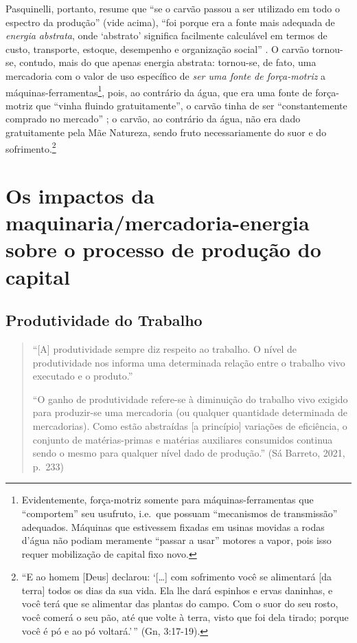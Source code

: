 \documentclass[12pt]{article}
\numberwithin{equation}{section}
\theoremstyle{plain}
\theoremstyle{definition}
\theoremstyle{remark}
\begin{document}
Pasquinelli, portanto, resume que ``se o carvão passou a ser utilizado em todo o espectro da produção'' (vide acima), ``foi porque era a fonte mais adequada de \textit{energia abstrata}, onde `abstrato' significa facilmente calculável em termos de custo, transporte, estoque, desempenho e organização social'' \parencite[, p. 122-3, grifo no original]{Pasquinelli2023}. O carvão tornou-se, contudo, mais do que apenas energia abstrata: tornou-se, de fato, uma mercadoria com o valor de uso específico de \textit{ser uma fonte de força-motriz} a máquinas-ferramentas\footnote{Evidentemente, força-motriz somente para máquinas-ferramentas que ``comportem'' seu usufruto, i.e.~que possuam ``mecanismos de transmissão'' adequados. Máquinas que estivessem fixadas em usinas movidas a rodas d'água não podiam meramente ``passar a usar'' motores a vapor, pois isso requer mobilização de capital fixo novo.}, pois, ao contrário da água, que era uma fonte de força-motriz que ``vinha fluindo gratuitamente'', o carvão tinha de ser ``constantemente comprado no mercado'' \parencite[, p. 29]{Malm2013}; o carvão, ao contrário da água, não era dado gratuitamente pela Mãe Natureza, sendo fruto necessariamente do suor e do sofrimento.\footnote{``E ao homem {[}Deus{]} declarou: `{[}\ldots{]} com sofrimento você se alimentará {[}da terra{]} todos os dias da sua vida. Ela lhe dará espinhos e ervas daninhas, e você terá que se alimentar das plantas do campo. Com o suor do seu rosto, você comerá o seu pão, até que volte à terra, visto que foi dela tirado; porque você é pó e ao pó voltará.'\,'' (Gn, 3:17-19).}

\hypertarget{os-impactos-da-maquinariamercadoria-energia-sobre-o-processo-de-produuxe7uxe3o-do-capital}{%
\section{Os impactos da maquinaria/mercadoria-energia sobre o processo de produção do capital}\label{os-impactos-da-maquinariamercadoria-energia-sobre-o-processo-de-produuxe7uxe3o-do-capital}}

\hypertarget{produtividade-do-trabalho}{%
\subsection{Produtividade do Trabalho}\label{produtividade-do-trabalho}}

\begin{quote}
``{[}A{]} produtividade sempre diz respeito ao trabalho. O nível de produtividade nos informa uma determinada relação entre o trabalho vivo executado e o produto.''

``O ganho de produtividade refere-se à diminuição do trabalho vivo exigido para produzir-se uma mercadoria (ou qualquer quantidade determinada de mercadorias). Como estão abstraídas {[}a princípio{]} variações de eficiência, o conjunto de matérias-primas e matérias auxiliares consumidos continua sendo o mesmo para qualquer nível dado de produção.'' (Sá Barreto, 2021, p.~233)
\end{quote}
\end{document}
